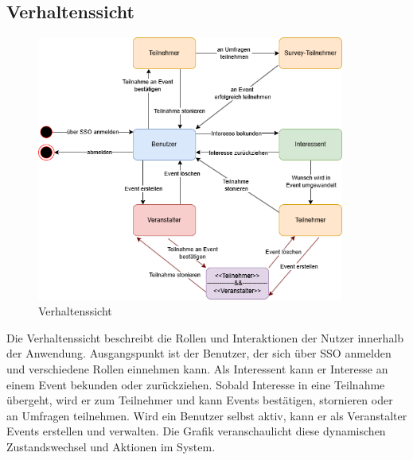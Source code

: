 \documentclass[a4paper,12pt]{article}
\begin{document}
\subsection{Verhaltenssicht}
\begin{figure}[H]
  \centering
  \includegraphics[width=0.9\textwidth]{Abbildungen/verhaltenssicht.png}
  \caption{Verhaltenssicht}
  \label{fig:verhaltenssicht}
\end{figure}
Die Verhaltenssicht beschreibt die Rollen und Interaktionen der Nutzer innerhalb der Anwendung. Ausgangspunkt ist der Benutzer, der sich über SSO anmelden und verschiedene Rollen einnehmen kann. Als Interessent kann er Interesse an einem Event bekunden oder zurückziehen. Sobald Interesse in eine Teilnahme übergeht, wird er zum Teilnehmer und kann Events bestätigen, stornieren oder an Umfragen teilnehmen. Wird ein Benutzer selbst aktiv, kann er als Veranstalter Events erstellen und verwalten. Die Grafik veranschaulicht diese dynamischen Zustandswechsel und Aktionen im System.
\end{document}
